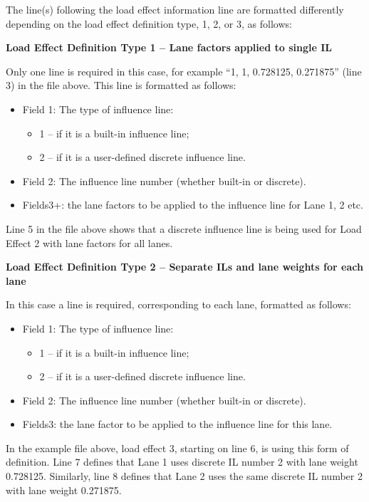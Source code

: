 \documentclass[
]{article}
\begin{document}
The line(s) following the load effect information line are formatted
differently depending on the load effect definition type, 1, 2, or 3, as
follows:

\textbf{Load Effect Definition Type 1 -- Lane factors applied to single
IL}

Only one line is required in this case, for example ``1, 1, 0.728125,
0.271875'' (line 3) in the file above. This line is formatted as
follows:

\begin{itemize}
\item
  Field 1: The type of influence line:

  \begin{itemize}
  \item
    1 -- if it is a built-in influence line;
  \item
    2 -- if it is a user-defined discrete influence line.
  \end{itemize}
\item
  Field 2: The influence line number (whether built-in or discrete).
\item
  Fields3+: the lane factors to be applied to the influence line for
  Lane 1, 2 etc.
\end{itemize}

Line 5 in the file above shows that a discrete influence line is being
used for Load Effect 2 with lane factors for all lanes.

\textbf{Load Effect Definition Type 2 -- Separate ILs and lane weights
for each lane}

In this case a line is required, corresponding to each lane, formatted
as follows:

\begin{itemize}
\item
  Field 1: The type of influence line:

  \begin{itemize}
  \item
    1 -- if it is a built-in influence line;
  \item
    2 -- if it is a user-defined discrete influence line.
  \end{itemize}
\item
  Field 2: The influence line number (whether built-in or discrete).
\item
  Fields3: the lane factor to be applied to the influence line for this
  lane.
\end{itemize}

In the example file above, load effect 3, starting on line 6, is using
this form of definition. Line 7 defines that Lane 1 uses discrete IL
number 2 with lane weight 0.728125. Similarly, line 8 defines that Lane
2 uses the same discrete IL number 2 with lane weight 0.271875.
\end{document}
